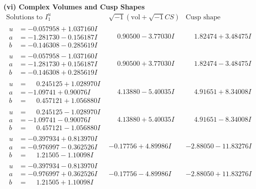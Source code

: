\documentclass[1p]{elsarticle_modified}
\theoremstyle{definition}
\newcommand{\I}{\sqrt{-1}}
\begin{document}
\newpage\flushleft \textbf{(vi) Complex Volumes and Cusp Shapes}
$$\begin{array}{c|c|c}  
\text{Solutions to }I^u_{1}& \I (\text{vol} + \sqrt{-1}CS) & \text{Cusp shape}\\
 \hline 
\begin{aligned}
u &= -0.057958 + 1.037160 I \\
a &= -1.281730 - 0.156187 I \\
b &= -0.146308 - 0.285619 I\end{aligned}
 & \phantom{-}0.90500 - 3.77030 I & \phantom{-}1.82474 + 3.48475 I \\ \hline\begin{aligned}
u &= -0.057958 - 1.037160 I \\
a &= -1.281730 + 0.156187 I \\
b &= -0.146308 + 0.285619 I\end{aligned}
 & \phantom{-}0.90500 + 3.77030 I & \phantom{-}1.82474 - 3.48475 I \\ \hline\begin{aligned}
u &= \phantom{-}0.245125 + 1.028970 I \\
a &= -1.09741 + 0.90076 I \\
b &= \phantom{-}0.457121 + 1.056880 I\end{aligned}
 & \phantom{-}4.13880 - 5.40035 I & \phantom{-}4.91651 + 8.34008 I \\ \hline\begin{aligned}
u &= \phantom{-}0.245125 - 1.028970 I \\
a &= -1.09741 - 0.90076 I \\
b &= \phantom{-}0.457121 - 1.056880 I\end{aligned}
 & \phantom{-}4.13880 + 5.40035 I & \phantom{-}4.91651 - 8.34008 I \\ \hline\begin{aligned}
u &= -0.397934 + 0.813970 I \\
a &= -0.976997 - 0.362526 I \\
b &= \phantom{-}1.21505 - 1.10098 I\end{aligned}
 & -0.17756 + 4.89986 I & -2.88050 - 11.83276 I \\ \hline\begin{aligned}
u &= -0.397934 - 0.813970 I \\
a &= -0.976997 + 0.362526 I \\
b &= \phantom{-}1.21505 + 1.10098 I\end{aligned}
 & -0.17756 - 4.89986 I & -2.88050 + 11.83276 I \\ \hline\begin{aligned}

\end{aligned}
\end{array}$$
\end{document}

